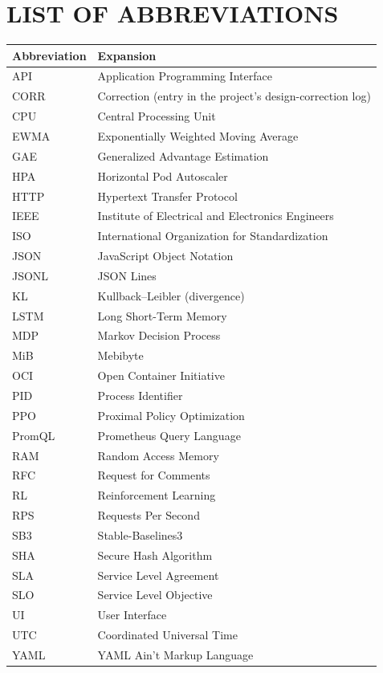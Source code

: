 \chapter*{\centering LIST OF ABBREVIATIONS}
\label{ch:abbreviations}

\begin{table}[H]
\centering
\begin{tabular}{ll}
\toprule
Abbreviation & Expansion \\
\midrule
API & Application Programming Interface \\
CORR & Correction (entry in the project's design-correction log) \\
CPU & Central Processing Unit \\
EWMA & Exponentially Weighted Moving Average \\
GAE & Generalized Advantage Estimation \\
HPA & Horizontal Pod Autoscaler \\
HTTP & Hypertext Transfer Protocol \\
IEEE & Institute of Electrical and Electronics Engineers \\
ISO & International Organization for Standardization \\
JSON & JavaScript Object Notation \\
JSONL & JSON Lines \\
KL & Kullback--Leibler (divergence) \\
LSTM & Long Short-Term Memory \\
MDP & Markov Decision Process \\
MiB & Mebibyte \\
OCI & Open Container Initiative \\
PID & Process Identifier \\
PPO & Proximal Policy Optimization \\
PromQL & Prometheus Query Language \\
RAM & Random Access Memory \\
RFC & Request for Comments \\
RL & Reinforcement Learning \\
RPS & Requests Per Second \\
SB3 & Stable-Baselines3 \\
SHA & Secure Hash Algorithm \\
SLA & Service Level Agreement \\
SLO & Service Level Objective \\
UI & User Interface \\
UTC & Coordinated Universal Time \\
YAML & YAML Ain't Markup Language \\
\bottomrule
\end{tabular}
\end{table}
